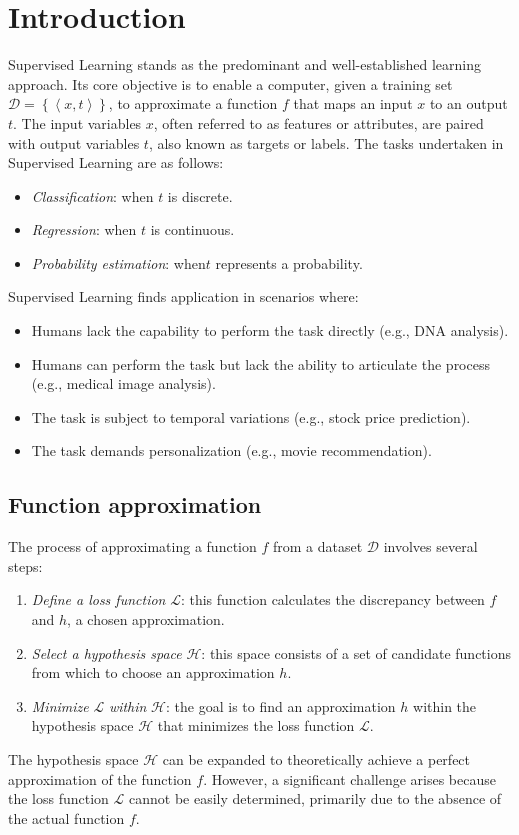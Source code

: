 \section{Introduction}

Supervised Learning stands as the predominant and well-established learning approach. 
Its core objective is to enable a computer, given a training set $\mathcal{D}=\left\{\left\langle x,t \right\rangle\right\}$, to approximate a function $f$ that maps an input $x$ to an output $t$.
The input variables $x$, often referred to as features or attributes, are paired with output variables $t$, also known as targets or labels. 
The tasks undertaken in Supervised Learning are as follows:
\begin{itemize}
    \item \textit{Classification}: when $t$ is discrete. 
    \item \textit{Regression}: when $t$ is continuous. 
    \item \textit{Probability estimation}: when$t$ represents a probability.
\end{itemize}
Supervised Learning finds application in scenarios where:
\begin{itemize}
    \item Humans lack the capability to perform the task directly (e.g., DNA analysis).
    \item Humans can perform the task but lack the ability to articulate the process (e.g., medical image analysis).
    \item The task is subject to temporal variations (e.g., stock price prediction).
    \item The task demands personalization (e.g., movie recommendation).
\end{itemize}

\subsection{Function approximation}
The process of approximating a function $f$ from a dataset $\mathcal{D}$ involves several steps:
\begin{enumerate}
    \item \textit{Define a loss function} $\mathcal{L}$: this function calculates the discrepancy between $f$ and $h$, a chosen approximation.
    \item \textit{Select a hypothesis space} $\mathcal{H}$: this space consists of a set of candidate functions from which to choose an approximation $h$. 
    \item \textit{Minimize} $\mathcal{L}$ \textit{within} $\mathcal{H}$: the goal is to find an approximation $h$ within the hypothesis space $\mathcal{H}$ that minimizes the loss function $\mathcal{L}$.
\end{enumerate}
The hypothesis space $\mathcal{H}$ can be expanded to theoretically achieve a perfect approximation of the function $f$. 
However, a significant challenge arises because the loss function $\mathcal{L}$ cannot be easily determined, primarily due to the absence of the actual function $f$.


